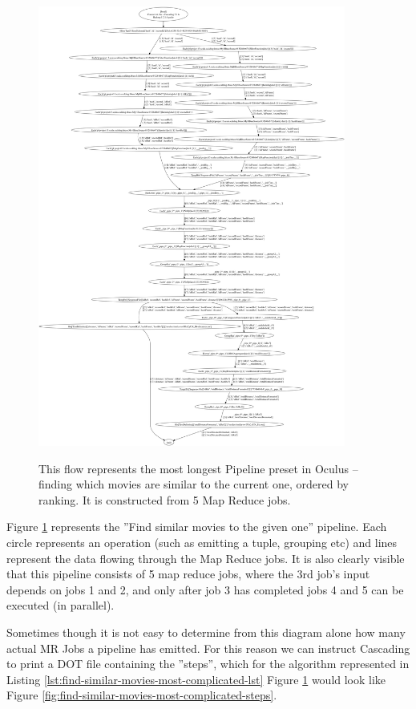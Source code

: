 \begin{figure}[ch!]
  \centering
  \includegraphics[width=0.9\textwidth]{img/FindSimilarMoviesJob_dot.png}
  \label{fig:find-similar-movies-most-complicated}
  \caption{This flow represents the most longest Pipeline preset in Oculus -- finding which movies are similar to the current one, ordered by ranking. It is constructed from 5 Map Reduce jobs.}
\end{figure}

Figure \ref{fig:find-similar-movies-most-complicated} represents the ''Find similar movies to the given one'' pipeline. Each circle represents an operation (such as emitting a tuple, grouping etc) and lines represent the data flowing through the Map Reduce jobs. It is also clearly visible that this pipeline consists of 5 map reduce jobs, where the 3rd job's input depends on jobs 1 and 2, and only after job 3 has completed jobs 4 and 5 can be executed (in parallel).

Sometimes though it is not easy to determine from this diagram alone how many actual MR Jobs a pipeline has emitted. For this reason we can instruct Cascading to print a DOT file containing the ''steps'', which for the algorithm represented in Listing \ref{lst:find-similar-movies-most-complicated-lst} Figure \ref{fig:find-similar-movies-most-complicated} would look like Figure \ref{fig:find-similar-movies-most-complicated-steps}.

